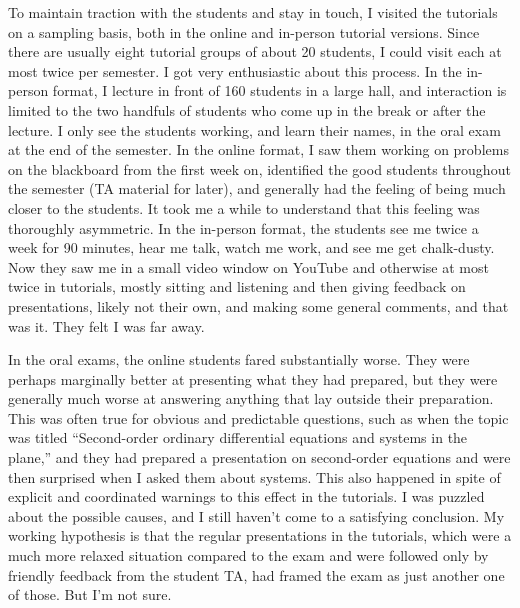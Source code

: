 \documentclass[10pt]{article}
\begin{document}
To maintain traction with the students and stay in touch, I visited the tutorials on a sampling basis, both in the online and in-person tutorial versions. Since there are usually eight tutorial groups of about 20 students, I could visit each at most twice per semester. I got very enthusiastic about this process. In the in-person format, I lecture in front of 160 students in a large hall, and interaction is limited to the two handfuls of students who come up in the break or after the lecture. I only see the students working, and learn their names, in the oral exam at the end of the semester. In the online format, I saw them working on problems on the blackboard from the first week on, identified the good students throughout the semester (TA material for later), and generally had the feeling of being much closer to the students. It took me a while to understand that this feeling was thoroughly asymmetric. In the in-person format, the students see me twice a week for 90 minutes, hear me talk, watch me work, and see me get chalk-dusty. Now they saw me in a small video window on YouTube and otherwise at most twice in tutorials, mostly sitting and listening and then giving feedback on presentations, likely not their own, and making some general comments, and that was it. They felt I was far away.

In the oral exams, the online students fared substantially worse. They were perhaps marginally better at presenting what they had prepared, but they were generally much worse at answering anything that lay outside their preparation. This was often true for obvious and predictable questions, such as when the topic was titled ``Second-order ordinary differential equations and systems in the plane,'' and they had prepared a presentation on second-order equations and were then surprised when I asked them about systems. This also happened in spite of explicit and coordinated warnings to this effect in the tutorials. I was puzzled about the possible causes, and I still haven't come to a satisfying conclusion. My working hypothesis is that the regular presentations in the tutorials, which were a much more relaxed situation compared to the exam and were followed only by friendly feedback from the student TA, had framed the exam as just another one of those. But I'm not sure.
\end{document}
